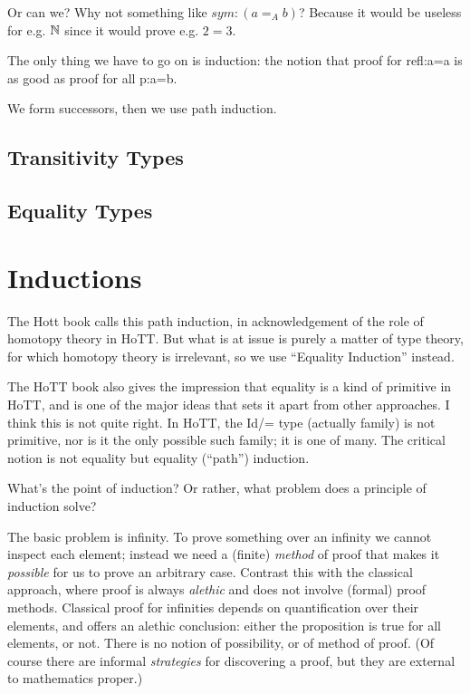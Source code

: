 \documentclass{article}
\begin{document}
Or can we?  Why not something like \(sym{:}(a=_A b)\)?  Because it
would be useless for e.g. \(\mathbb{N}\) since it would prove e.g. \(2=3\).

The only thing we have to go on is induction: the notion that proof
for refl:a=a is as good as proof for all p:a=b.



We form successors, then we use path induction.

\vfill

\subsection{Transitivity Types}

\subsection{Equality Types}

\section{Inductions}

The Hott book calls this path induction, in acknowledgement of the
role of homotopy theory in HoTT.  But what is at issue is purely a
matter of type theory, for which homotopy theory is irrelevant, so we
use ``Equality Induction'' instead.

The HoTT book also gives the impression that equality is a kind of
primitive in HoTT, and is one of the major ideas that sets it apart
from other approaches.  I think this is not quite right.  In HoTT, the
Id/= type (actually family) is not primitive, nor is it the only
possible such family; it is one of many.  The critical notion is not
equality but equality (``path'') induction.

What's the point of induction?  Or rather, what problem does a
principle of induction solve?

The basic problem is infinity.  To prove something over an infinity we
cannot inspect each element; instead we need a (finite) \emph{method}
of proof that makes it \emph{possible} for us to prove an arbitrary
case.  Contrast this with the classical approach, where proof is
always \emph{alethic} and does not involve (formal) proof methods.
Classical proof for infinities depends on quantification over their
elements, and offers an alethic conclusion: either the proposition is
true for all elements, or not.  There is no notion of possibility, or
of method of proof.  (Of course there are informal \emph{strategies}
for discovering a proof, but they are external to mathematics proper.)
\end{document}
